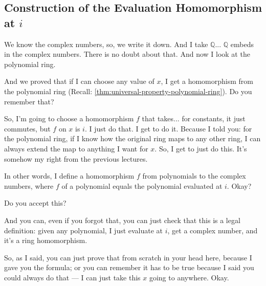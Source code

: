 \subsection{Construction of the Evaluation Homomorphism at \texorpdfstring{$i$}{i}}

\begin{speech}[01:20:56 - 01:22:36]
We know the complex numbers, so, we write it down.  And I take $\mathbb{Q}$...  $\mathbb{Q}$ embeds in the complex numbers. There is no doubt about that. And now I look at the polynomial ring.  

And we proved that if I can choose any value of $x$, I get a homomorphism from the polynomial ring (Recall: \cref{thm:universal-property-polynomial-ring}). Do you remember that? 

So, I'm going to choose a homomorphism $f$ that takes... for constants, it just commutes, but $f$ on $x$ is $i$.  I just do that. I get to do it. Because I told you: for the polynomial ring, if I know how the original ring maps to any other ring, I can always extend the map to anything I want for $x$. So, I get to just do this. It's somehow my right from the previous lectures. 

In other words, I define a homomorphism $f$ from polynomials to the complex numbers,  where $f$ of a polynomial equals the polynomial evaluated at $i$.  Okay? 

Do you accept this? 

And you can, even if you forgot that, you can just check that this is a legal definition: given any polynomial, I just evaluate at $i$, get a complex number, and it's a ring homomorphism.  

So, as I said, you can just prove that from scratch in your head here, because I gave you the formula; or you can remember it has to be true because I said you could always do that --- I can just take this $x$ going to anywhere. Okay.
\end{speech}

\begin{hidden}
\end{hidden}

